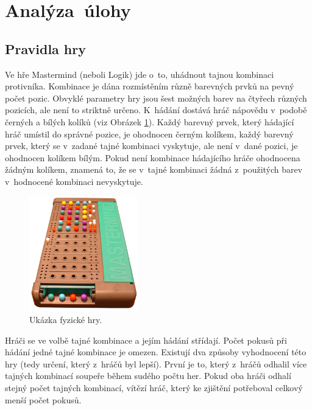 \documentclass[12pt, a4paper]{article}
\begin{document}
\section{Analýza~úlohy} %

\subsection{Pravidla hry}

Ve hře Mastermind (neboli Logik) jde o~to, uhádnout tajnou kombinaci protivníka. Kombinace je dána rozmístěním různě barevných prvků na pevný počet pozic. Obvyklé parametry hry jsou šest možných barev na čtyřech různých pozicích, ale není to striktně určeno. K~hádání dostává hráč nápovědu v~podobě černých a bílých kolíků (viz Obrázek \ref{fig:game}). Každý barevný prvek, který hádající hráč umístil do správné pozice, je ohodnocen černým kolíkem, každý barevný prvek, který se v~zadané tajné kombinaci vyskytuje, ale není v~dané pozici, je ohodnocen kolíkem bílým. Pokud není kombinace hádajícího hráče ohodnocena žádným kolíkem, znamená to, že se v~tajné kombinaci žádná z~použitých barev v~hodnocené kombinaci nevyskytuje. 

\begin{figure}[ht]
\centering
\includegraphics[bb= 0 0 600 637 , height=5cm]{game.jpg}
\caption{Ukázka fyzické hry.}
\label{fig:game}
\end{figure}

Hráči se ve volbě tajné kombinace a jejím hádání střídají. Počet pokusů při hádání jedné tajné kombinace je omezen. Existují dva způsoby vyhodnocení této hry (tedy určení, který z~hráčů byl lepší). První je to, který z~hráčů odhalil více tajných kombinací soupeře během sudého počtu her. Pokud oba hráči odhalí stejný počet tajných kombinací, vítězí hráč, který ke zjištění potřeboval celkový menší počet pokusů. 
\end{document}
